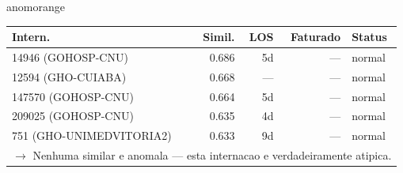 \documentclass[a4paper,10pt]{article}
\begin{document}
\begin{anomalycard}[Internacao 162201 | GHO-PETROBRAS | ALTO (z=4.53)]{anomorange}
\begin{tabular}{l r r r l}\toprule\textbf{Intern.} & \textbf{Simil.} & \textbf{LOS} & \textbf{Faturado} & \textbf{Status} \\\midrule
14946 (GOHOSP-CNU) & 0.686 & 5d & --- & \textcolor{jcubeblue}{normal} \\
12594 (GHO-CUIABA) & 0.668 & --- & --- & \textcolor{jcubeblue}{normal} \\
147570 (GOHOSP-CNU) & 0.664 & 5d & --- & \textcolor{jcubeblue}{normal} \\
209025 (GOHOSP-CNU) & 0.635 & 4d & --- & \textcolor{jcubeblue}{normal} \\
751 (GHO-UNIMEDVITORIA2) & 0.633 & 9d & --- & \textcolor{jcubeblue}{normal} \\
\multicolumn{5}{l}{\textcolor{jcubeblue}{\small $\rightarrow$ Nenhuma similar e anomala --- esta internacao e verdadeiramente atipica.}} \\
\bottomrule\end{tabular}



\end{anomalycard}

\newpage
\end{document}
